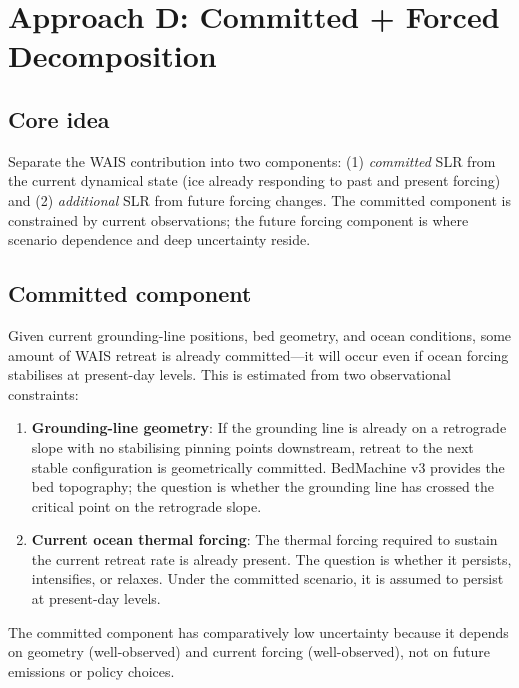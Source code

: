 \documentclass[11pt]{article}
\begin{document}
\section{Approach D: Committed + Forced Decomposition}
\label{sec:approach_d}

\subsection{Core idea}

Separate the WAIS contribution into two components: (1) \emph{committed} SLR from the current dynamical state (ice already responding to past and present forcing) and (2) \emph{additional} SLR from future forcing changes.  The committed component is constrained by current observations; the future forcing component is where scenario dependence and deep uncertainty reside.

\subsection{Committed component}

Given current grounding-line positions, bed geometry, and ocean conditions, some amount of WAIS retreat is already committed---it will occur even if ocean forcing stabilises at present-day levels.  This is estimated from two observational constraints:

\begin{enumerate}
  \item \textbf{Grounding-line geometry}: If the grounding line is already on a retrograde slope with no stabilising pinning points downstream, retreat to the next stable configuration is geometrically committed.  BedMachine v3 provides the bed topography; the question is whether the grounding line has crossed the critical point on the retrograde slope.

  \item \textbf{Current ocean thermal forcing}: The thermal forcing required to sustain the current retreat rate is already present.  The question is whether it persists, intensifies, or relaxes.  Under the committed scenario, it is assumed to persist at present-day levels.
\end{enumerate}

The committed component has comparatively low uncertainty because it depends on geometry (well-observed) and current forcing (well-observed), not on future emissions or policy choices.
\end{document}

